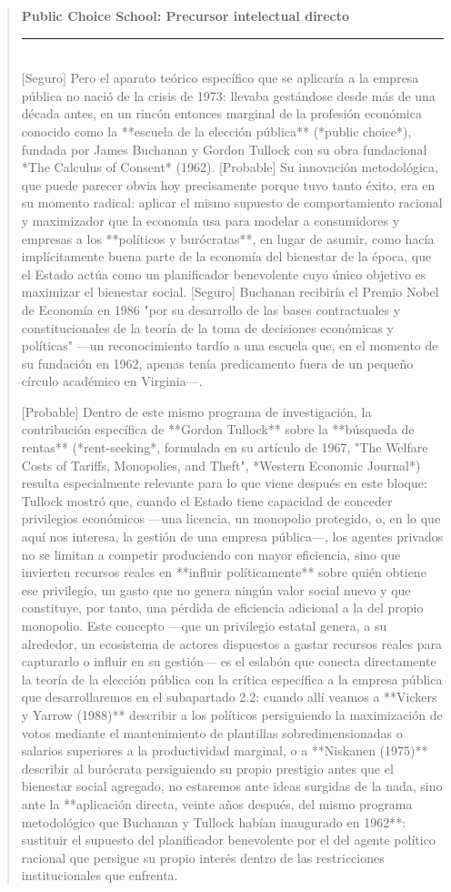 \documentclass[10pt,a4paper]{article}
\newenvironment{specialblock}[1]{%
      \begin{quote} %
      \small %
      \noindent\textbf{#1}\\[-0.3em] %
      \rule{\linewidth}{0.4pt}\\[0.6em]}{
      \end{quote}}
\begin{document}
\begin{specialblock}{Public Choice School: Precursor intelectual directo}
    [Seguro] Pero el aparato teórico específico que se aplicaría a la empresa pública no nació de la crisis de 1973: llevaba gestándose desde más de una década antes, en un rincón entonces marginal de la profesión económica conocido como la **escuela de la elección pública** (*public choice*), fundada por James Buchanan y Gordon Tullock con su obra fundacional *The Calculus of Consent* (1962). [Probable] Su innovación metodológica, que puede parecer obvia hoy precisamente porque tuvo tanto éxito, era en su momento radical: aplicar el mismo supuesto de comportamiento racional y maximizador que la economía usa para modelar a consumidores y empresas a los **políticos y burócratas**, en lugar de asumir, como hacía implícitamente buena parte de la economía del bienestar de la época, que el Estado actúa como un planificador benevolente cuyo único objetivo es maximizar el bienestar social. [Seguro] Buchanan recibiría el Premio Nobel de Economía en 1986 "por su desarrollo de las bases contractuales y constitucionales de la teoría de la toma de decisiones económicas y políticas" —un reconocimiento tardío a una escuela que, en el momento de su fundación en 1962, apenas tenía predicamento fuera de un pequeño círculo académico en Virginia—.
    
    [Probable] Dentro de este mismo programa de investigación, la contribución específica de **Gordon Tullock** sobre la **búsqueda de rentas** (*rent-seeking*, formulada en su artículo de 1967, "The Welfare Costs of Tariffs, Monopolies, and Theft", *Western Economic Journal*) resulta especialmente relevante para lo que viene después en este bloque: Tullock mostró que, cuando el Estado tiene capacidad de conceder privilegios económicos —una licencia, un monopolio protegido, o, en lo que aquí nos interesa, la gestión de una empresa pública—, los agentes privados no se limitan a competir produciendo con mayor eficiencia, sino que invierten recursos reales en **influir políticamente** sobre quién obtiene ese privilegio, un gasto que no genera ningún valor social nuevo y que constituye, por tanto, una pérdida de eficiencia adicional a la del propio monopolio. Este concepto —que un privilegio estatal genera, a su alrededor, un ecosistema de actores dispuestos a gastar recursos reales para capturarlo o influir en su gestión— es el eslabón que conecta directamente la teoría de la elección pública con la crítica específica a la empresa pública que desarrollaremos en el subapartado 2.2: cuando allí veamos a **Vickers y Yarrow (1988)** describir a los políticos persiguiendo la maximización de votos mediante el mantenimiento de plantillas sobredimensionadas o salarios superiores a la productividad marginal, o a **Niskanen (1975)** describir al burócrata persiguiendo su propio prestigio antes que el bienestar social agregado, no estaremos ante ideas surgidas de la nada, sino ante la **aplicación directa, veinte años después, del mismo programa metodológico que Buchanan y Tullock habían inaugurado en 1962**: sustituir el supuesto del planificador benevolente por el del agente político racional que persigue su propio interés dentro de las restricciones institucionales que enfrenta.
    

\end{specialblock}
\end{document}
